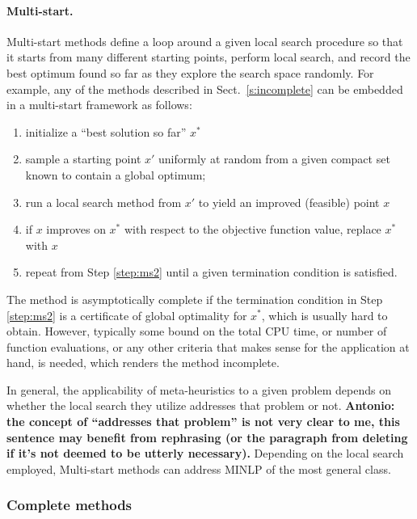 \paragraph{Multi-start.}
%
Multi-start methods define a loop around a given local search procedure so that it starts from many different starting points, perform local search, and record the best optimum found so far as they explore the search space randomly. For example, any of the methods described in Sect.~\ref{s:incomplete} can be embedded in a multi-start framework as follows:
%
\begin{enumerate}
 \item initialize a ``best solution so far'' $x^\ast$ 
 \item sample a starting point $x'$ uniformly at random from a given compact set known to contain a global optimum; \label{step:ms2}
 \item run a local search method from $x'$ to yield an improved (feasible) point $x$
 \item if $x$ improves on $x^\ast$ with respect to the objective function value, replace $x^\ast$ with $x$
 \item repeat from Step \ref{step:ms2} until a given termination condition is satisfied. \label{step:ms5}
\end{enumerate}
%
The method is asymptotically complete if the termination condition in Step \ref{step:ms2} is a certificate of global optimality for $x^\ast$, which is usually hard to obtain. However, typically some bound on the total CPU time, or number of function evaluations, or any other criteria that makes sense for the application at hand, is needed, which renders the method incomplete.

In general, the applicability of meta-heuristics to a given problem depends 
on whether the local search they utilize
addresses that problem or not. 
{\bf Antonio: the concept of ``addresses that problem'' is not very clear to me, this sentence may benefit from rephrasing (or the paragraph from deleting if it's not deemed to be utterly necessary).} Depending on the local search employed, Multi-start methods can address MINLP of the most general class.

\subsubsection{Complete methods}\label{s:complete}

